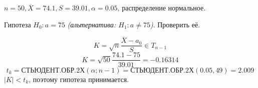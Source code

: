 

\cfoot{}



\begin{exercise}
    \(n = 50, \overline{X} = 74.1, S = 39.01, \alpha = 0.05\), распределение нормальное.

    Гипотеза \(H_0 : a = 75\) \textit{(альтернатива: \(H_1 : a \neq 75\))}. Проверить её.
\end{exercise}
\begin{solution}
    \[K = \sqrt{n} \frac{ \overline{X} - a_0}{S} \in T_{n-1}\]
    \[K = \sqrt{50} \frac{74.1 - 75}{39.01} = - 0.16314\]
    \[t_k = \text{СТЬЮДЕНТ.ОБР.2Х}(\alpha; n - 1) = \text{СТЬЮДЕНТ.ОБР.2Х}(0.05, 49) = 2.009\]
    \(|K| < t_k\), поэтому гипотеза принимается.
\end{solution}


